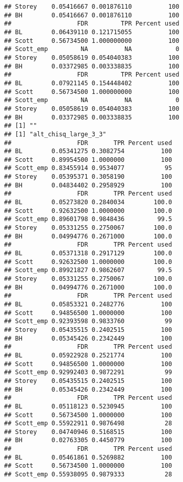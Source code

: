\documentclass{article}\usepackage[]{graphicx}\usepackage[]{color}
\makeatletter
\newenvironment{kframe}{%
 \def\at@end@of@kframe{}%
 \ifinner\ifhmode%
  \def\at@end@of@kframe{\end{minipage}}%
  \begin{minipage}{\columnwidth}%
 \fi\fi%
 \def\FrameCommand##1{\hskip\@totalleftmargin \hskip-\fboxsep
 \colorbox{shadecolor}{##1}\hskip-\fboxsep
     \hskip-\linewidth \hskip-\@totalleftmargin \hskip\columnwidth}%
 \MakeFramed {\advance\hsize-\width
   \@totalleftmargin\z@ \linewidth\hsize
   \@setminipage}}%
 {\par\unskip\endMakeFramed%
 \at@end@of@kframe}
\newenvironment{knitrout}{}{} %
\makeatother
\begin{document}
\begin{knitrout}
\begin{kframe}
\begin{verbatim}
## Storey    0.05416667 0.001876110          100
## BH        0.05416667 0.001876110          100
##                  FDR         TPR Percent used
## BL        0.06439110 0.121715055          100
## Scott     0.56734500 1.000000000          100
## Scott_emp         NA          NA            0
## Storey    0.05058619 0.054040383          100
## BH        0.03372985 0.003338835          100
##                  FDR         TPR Percent used
## BL        0.07921145 0.154448402          100
## Scott     0.56734500 1.000000000          100
## Scott_emp         NA          NA            0
## Storey    0.05058619 0.054040383          100
## BH        0.03372985 0.003338835          100
## [1] ""
## [1] "alt_chisq_large_3_3"
##                  FDR       TPR Percent used
## BL        0.05341275 0.3082754          100
## Scott     0.89954500 1.0000000          100
## Scott_emp 0.83455914 0.9534077           95
## Storey    0.05395371 0.3058190          100
## BH        0.04834402 0.2958929          100
##                  FDR       TPR Percent used
## BL        0.05273820 0.2840034        100.0
## Scott     0.92632500 1.0000000        100.0
## Scott_emp 0.89601798 0.9848436         99.5
## Storey    0.05331255 0.2750067        100.0
## BH        0.04994776 0.2671000        100.0
##                  FDR       TPR Percent used
## BL        0.05371318 0.2917129        100.0
## Scott     0.92632500 1.0000000        100.0
## Scott_emp 0.89921827 0.9862607         99.5
## Storey    0.05331255 0.2750067        100.0
## BH        0.04994776 0.2671000        100.0
##                  FDR       TPR Percent used
## BL        0.05853321 0.2482776          100
## Scott     0.94856500 1.0000000          100
## Scott_emp 0.92393598 0.9833760           99
## Storey    0.05435515 0.2402515          100
## BH        0.05345426 0.2342449          100
##                  FDR       TPR Percent used
## BL        0.05922928 0.2521774          100
## Scott     0.94856500 1.0000000          100
## Scott_emp 0.92992403 0.9872291           99
## Storey    0.05435515 0.2402515          100
## BH        0.05345426 0.2342449          100
##                  FDR       TPR Percent used
## BL        0.05118123 0.5230945          100
## Scott     0.56734500 1.0000000          100
## Scott_emp 0.55922911 0.9876498           28
## Storey    0.04740946 0.5168515          100
## BH        0.02763305 0.4450779          100
##                  FDR       TPR Percent used
## BL        0.05461861 0.5269882          100
## Scott     0.56734500 1.0000000          100
## Scott_emp 0.55938095 0.9879333           28

\end{verbatim}
\end{kframe}
\end{knitrout}
\end{document}
